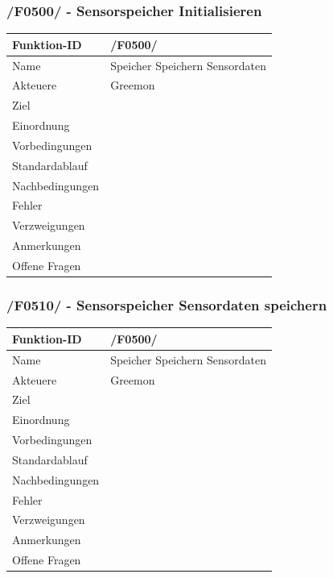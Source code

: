 \documentclass[pointlessnumbers]{scrartcl}
\begin{document}
 \subsubsection{/F0500/ - Sensorspeicher Initialisieren}
 \begin{tabular}{|p{\BreiteErsterTab}|p{\BreiteZweiterTab}|}\hline
    Funktion-ID &       /F0500/  
                        \\ \hline
    Name &              Speicher Speichern Sensordaten
                        \\ \hline
    Akteuere &          Greemon
                        \\ \hline
    Ziel &             
                        \\ \hline
    Einordnung &        
                        \\ \hline
    Vorbedingungen &    
                        \\ \hline
    Standardablauf &    
                        \\ \hline
    Nachbedingungen &   
                        \\ \hline
    Fehler &       
                        \\ \hline
    Verzweigungen &     
                        \\ \hline
    Anmerkungen &       
                        \\ \hline
    Offene Fragen &     
                        \\ \hline
 \end{tabular}  
 
 \subsubsection{/F0510/ - Sensorspeicher Sensordaten speichern}
 \begin{tabular}{|p{\BreiteErsterTab}|p{\BreiteZweiterTab}|}\hline
    Funktion-ID &       /F0500/  
                        \\ \hline
    Name &              Speicher Speichern Sensordaten
                        \\ \hline
    Akteuere &          Greemon
                        \\ \hline
    Ziel &             
                        \\ \hline
    Einordnung &        
                        \\ \hline
    Vorbedingungen &    
                        \\ \hline
    Standardablauf &    
                        \\ \hline
    Nachbedingungen &   
                        \\ \hline
    Fehler &       
                        \\ \hline
    Verzweigungen &     
                        \\ \hline
    Anmerkungen &       
                        \\ \hline
    Offene Fragen &     
                        \\ \hline
 \end{tabular} 
 
\end{document}
